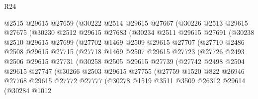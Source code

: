 \begin{lexlean}{R24}
\begin{coremodule}
              @2515
              @29615
              @27659
              (@30222
                @2514
                @29615
                @27667
                (@30226
                  @2513
                  @29615
                  @27675
                  (@30230
                    @2512
                    @29615
                    @27683
                    (@30234
                      @2511
                      @29615
                      @27691
                      (@30238
                        @2510
                        @29615
                        @27699
                        (@27702
                          @1469
                          @2509
                          @29615
                          @27707
                          (@27710
                            @2486
                            @2508
                            @29615
                            @27715
                            (@27718
                              @1469
                              @2507
                              @29615
                              @27723
                              (@27726
                                @2493
                                @2506
                                @29615
                                @27731
                                (@30258
                                  @2505
                                  @29615
                                  @27739
                                  (@27742
                                    @2498
                                    @2504
                                    @29615
                                    @27747
                                    (@30266
                                      @2503
                                      @29615
                                      @27755
                                      (@27759
                                        @1520
                                        @822
                                        @26946
                                        @27768
                                        @29615
                                        @27772
                                        @27777
                                        (@30278
                                          @1519
                                          @3511
                                          @3509
                                          @26312
                                          @29614
                                          (@30284
                                            @1012

\end{coremodule}
\end{lexlean}
